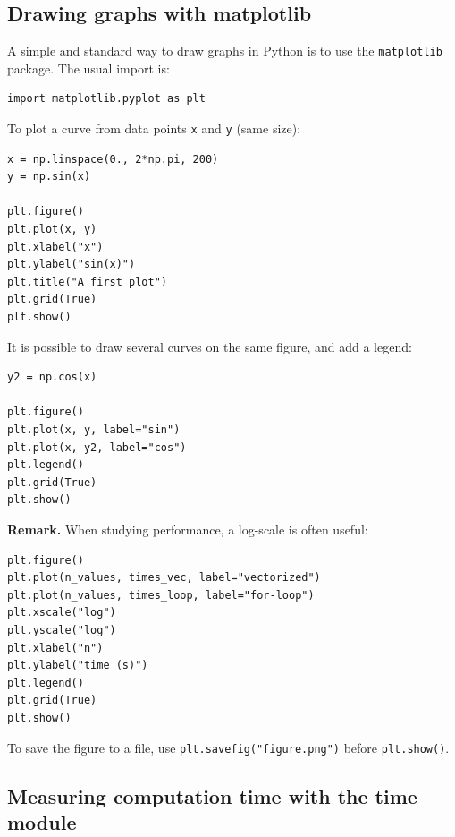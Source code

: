 \documentclass[11pt]{article}
\begin{document}
\subsection{Drawing graphs with matplotlib}

A simple and standard way to draw graphs in Python is to use the \texttt{matplotlib} package.
The usual import is:

\begin{lstlisting}
import matplotlib.pyplot as plt
\end{lstlisting}

\medskip
To plot a curve from data points \texttt{x} and \texttt{y} (same size):

\begin{lstlisting}
x = np.linspace(0., 2*np.pi, 200)
y = np.sin(x)

plt.figure()
plt.plot(x, y)
plt.xlabel("x")
plt.ylabel("sin(x)")
plt.title("A first plot")
plt.grid(True)
plt.show()
\end{lstlisting}

\medskip
It is possible to draw several curves on the same figure, and add a legend:

\begin{lstlisting}
y2 = np.cos(x)

plt.figure()
plt.plot(x, y, label="sin")
plt.plot(x, y2, label="cos")
plt.legend()
plt.grid(True)
plt.show()
\end{lstlisting}

\medskip
\textbf{Remark.} When studying performance, a log-scale is often useful:

\begin{lstlisting}
plt.figure()
plt.plot(n_values, times_vec, label="vectorized")
plt.plot(n_values, times_loop, label="for-loop")
plt.xscale("log")
plt.yscale("log")
plt.xlabel("n")
plt.ylabel("time (s)")
plt.legend()
plt.grid(True)
plt.show()
\end{lstlisting}

To save the figure to a file, use \texttt{plt.savefig("figure.png")} before \texttt{plt.show()}.

\subsection{Measuring computation time with the time module}
\end{document}
